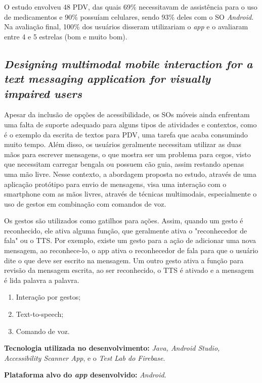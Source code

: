 O estudo envolveu 48 PDV, das quais 69\% necessitavam de assistência para o uso de medicamentos e 90\% possuíam celulares, sendo 93\%  deles com o SO \emph{Android}.
Na avaliação final, 100\% dos usuários disseram utilizariam o \emph{app} e o avaliaram entre 4 e 5 estrelas (bom e muito bom).


\subsection{\emph{Designing multimodal mobile interaction for a text messaging application for visually impaired users}}

Apesar da inclusão de opções de acessibilidade, os SOs móveis ainda enfrentam uma falta de suporte adequado para alguns tipos de atividades e contextos, como é o exemplo da escrita de textos para PDV, uma tarefa que acaba consumindo muito tempo.
Além disso, os usuários geralmente necessitam utilizar as duas mãos para escrever mensagens, o que mostra ser um problema para cegos, visto que necessitam carregar bengala ou possuem cão guia, assim restando apenas uma mão livre.
Nesse contexto, a abordagem proposta no estudo, através de uma aplicação protótipo para envio de mensagens, visa uma interação com o smartphone com as mãos livres, através de técnicas multimodais, especialmente o uso de gestos em combinação com comandos de voz.

Os gestos são utilizados como gatilhos para ações.
Assim, quando um gesto é reconhecido, ele ativa alguma função, que geralmente ativa o "reconhecedor de fala" ou o TTS.
Por exemplo, existe um gesto para a ação de adicionar uma nova mensagem, ao reconhece-lo, o app ativa o reconhecedor de fala para que o usuário dite o que deve ser escrito na mensagem.
Um outro gesto ativa a função para revisão da mensagem escrita, ao ser reconhecido, o TTS é ativado e a mensagem é lida palavra a palavra.

\begin{enumerate}
\item Interação por gestos;
\item Text-to-speech;
\item Comando de voz.
\end{enumerate}

\textbf{Tecnologia utilizada no desenvolvimento:} \emph{Java, Android Studio, Accessibility Scanner App}, e o \emph{Test Lab do Firebase}.

\textbf{Plataforma alvo do \emph{app} desenvolvido:} \emph{Android}.

